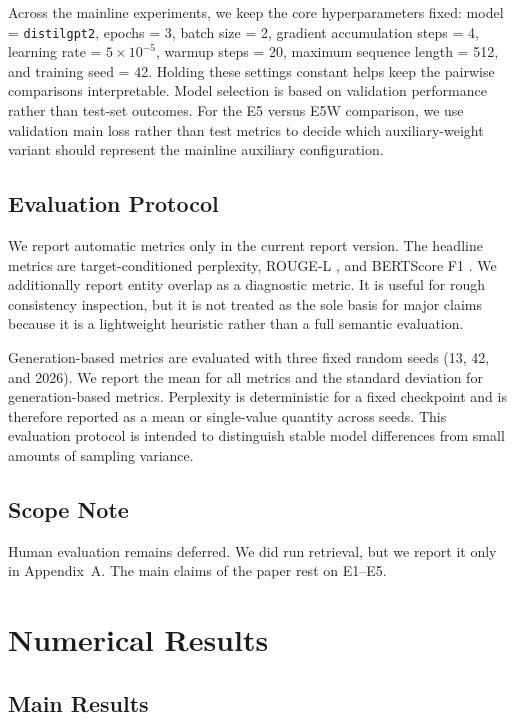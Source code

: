 \documentclass{article}
\newcommand{\model}{\texttt{distilgpt2}}
\newcommand{\expid}[1]{\textsc{#1}}
\begin{document}
Across the mainline experiments, we keep the core hyperparameters fixed: model = \model{}, epochs = 3, batch size = 2, gradient accumulation steps = 4, learning rate = $5\times 10^{-5}$, warmup steps = 20, maximum sequence length = 512, and training seed = 42. Holding these settings constant helps keep the pairwise comparisons interpretable. Model selection is based on validation performance rather than test-set outcomes. For the \expid{E5} versus \expid{E5W} comparison, we use validation main loss rather than test metrics to decide which auxiliary-weight variant should represent the mainline auxiliary configuration.

\subsection{Evaluation Protocol}

We report automatic metrics only in the current report version. The headline metrics are target-conditioned perplexity, ROUGE-L \citep{lin2004rouge}, and BERTScore F1 \citep{zhang2020bertscore}. We additionally report entity overlap as a diagnostic metric. It is useful for rough consistency inspection, but it is not treated as the sole basis for major claims because it is a lightweight heuristic rather than a full semantic evaluation.

Generation-based metrics are evaluated with three fixed random seeds (13, 42, and 2026). We report the mean for all metrics and the standard deviation for generation-based metrics. Perplexity is deterministic for a fixed checkpoint and is therefore reported as a mean or single-value quantity across seeds. This evaluation protocol is intended to distinguish stable model differences from small amounts of sampling variance.

\subsection{Scope Note}

Human evaluation remains deferred. We did run retrieval, but we report it only in Appendix~A. The main claims of the paper rest on \expid{E1}--\expid{E5}.

\section{Numerical Results}

\subsection{Main Results}
\end{document}
